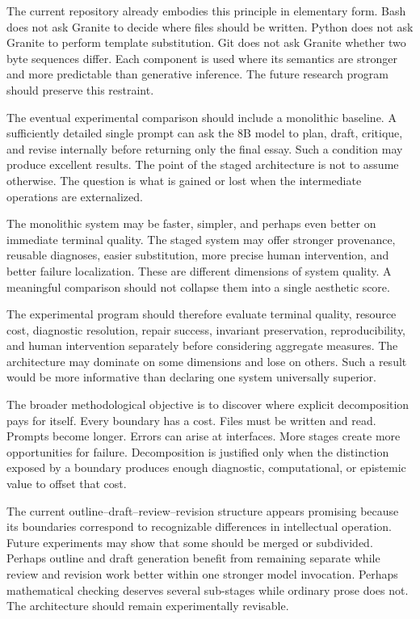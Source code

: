 \documentclass[11pt]{article}
\begin{document}
The current repository already embodies this principle in elementary form. Bash does not ask Granite to decide where files should be written. Python does not ask Granite to perform template substitution. Git does not ask Granite whether two byte sequences differ. Each component is used where its semantics are stronger and more predictable than generative inference. The future research program should preserve this restraint.

The eventual experimental comparison should include a monolithic baseline. A sufficiently detailed single prompt can ask the 8B model to plan, draft, critique, and revise internally before returning only the final essay. Such a condition may produce excellent results. The point of the staged architecture is not to assume otherwise. The question is what is gained or lost when the intermediate operations are externalized.

The monolithic system may be faster, simpler, and perhaps even better on immediate terminal quality. The staged system may offer stronger provenance, reusable diagnoses, easier substitution, more precise human intervention, and better failure localization. These are different dimensions of system quality. A meaningful comparison should not collapse them into a single aesthetic score.

The experimental program should therefore evaluate terminal quality, resource cost, diagnostic resolution, repair success, invariant preservation, reproducibility, and human intervention separately before considering aggregate measures. The architecture may dominate on some dimensions and lose on others. Such a result would be more informative than declaring one system universally superior.

The broader methodological objective is to discover where explicit decomposition pays for itself. Every boundary has a cost. Files must be written and read. Prompts become longer. Errors can arise at interfaces. More stages create more opportunities for failure. Decomposition is justified only when the distinction exposed by a boundary produces enough diagnostic, computational, or epistemic value to offset that cost.

The current outline--draft--review--revision structure appears promising because its boundaries correspond to recognizable differences in intellectual operation. Future experiments may show that some should be merged or subdivided. Perhaps outline and draft generation benefit from remaining separate while review and revision work better within one stronger model invocation. Perhaps mathematical checking deserves several sub-stages while ordinary prose does not. The architecture should remain experimentally revisable.
\end{document}
